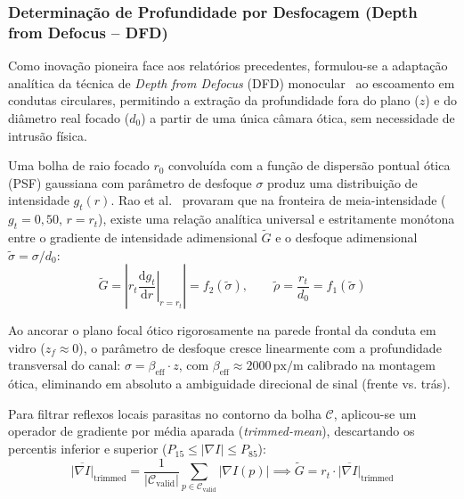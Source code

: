 \subsubsection{Determinação de Profundidade por Desfocagem (Depth from Defocus -- DFD)}
\label{subsubsec:dfd_monocular}

Como inovação pioneira face aos relatórios precedentes, formulou-se a adaptação analítica da técnica de \emph{Depth from Defocus} (DFD) monocular~\cite{rao2024depth} ao escoamento em condutas circulares, permitindo a extração da profundidade fora do plano ($z$) e do diâmetro real focado ($d_0$) a partir de uma única câmara ótica, sem necessidade de intrusão física.

Uma bolha de raio focado $r_0$ convoluída com a função de dispersão pontual ótica (PSF) gaussiana com parâmetro de desfoque $\sigma$ produz uma distribuição de intensidade $g_t(r)$. Rao et al.~\cite{rao2024depth} provaram que na fronteira de meia-intensidade ($g_t = 0{,}50$, $r=r_t$), existe uma relação analítica universal e estritamente monótona entre o gradiente de intensidade adimensional $\widetilde{G}$ e o desfoque adimensional $\widetilde{\sigma} = \sigma / d_0$:
\begin{equation}
    \widetilde{G} = \left| r_t \left. \frac{\mathrm{d}g_t}{\mathrm{d}r} \right|_{r=r_t} \right| = f_2(\widetilde{\sigma}), \qquad \widetilde{\rho} = \frac{r_t}{d_0} = f_1(\widetilde{\sigma})
\end{equation}

Ao ancorar o plano focal ótico rigorosamente na parede frontal da conduta em vidro ($z_f \approx 0$), o parâmetro de desfoque cresce linearmente com a profundidade transversal do canal: $\sigma = \beta_{\text{eff}} \cdot z$, com $\beta_{\text{eff}} \approx 2000\,\mathrm{px/m}$ calibrado na montagem ótica, eliminando em absoluto a ambiguidade direcional de sinal (frente vs. trás).

Para filtrar reflexos locais parasitas no contorno da bolha $\mathcal{C}$, aplicou-se um operador de gradiente por média aparada (\emph{trimmed-mean}), descartando os percentis inferior e superior ($P_{15} \le |\nabla I| \le P_{85}$):
\begin{equation}
    \overline{|\nabla I|}_{\text{trimmed}} = \frac{1}{|\mathcal{C}_{\text{valid}}|} \sum_{p \in \mathcal{C}_{\text{valid}}} |\nabla I(p)| \implies \widetilde{G} = r_t \cdot \overline{|\nabla I|}_{\text{trimmed}}
\end{equation}

